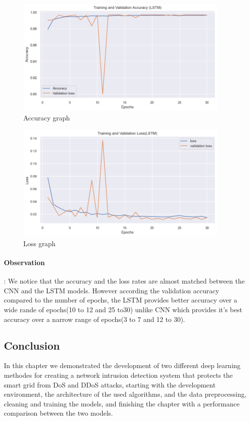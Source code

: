 		\begin{figure}[h]
			\centering
			\includegraphics[width=400px]{figures/LSTM_training_validation.png}
			\caption{Accuracy graph}
			\label{fig:aa}
		\end{figure}
\newpage
		\begin{figure}[h]
			\centering
			\includegraphics[width=400px]{figures/LSTM_training_validation_loss.png}
			\caption{Loss graph}
			\label{fig:ff}
		\end{figure}
		





\paragraph{Observation}: We notice that the accuracy and the loss rates are almost matched between the CNN and the LSTM models. However according the validation accuracy compared to the number of epochs, the LSTM provides better accuracy over a wide rande of epochs(10 to 12 and 25 to30) unlike CNN which provides it's best accuracy over a narrow range of epochs(3 to 7 and 12 to 30).

		







\subsection{Conclusion}
In this chapter we demonstrated the development of two different deep learning methodes for creating a network intrusion detection system that protects the smart grid from DoS and DDoS attacks, starting with the development environment, the architecture of the used algorithms, and the data preprocessing, cleaning and training the models, and finishing the chapter with a performance comparison between the two models.





\newpage












